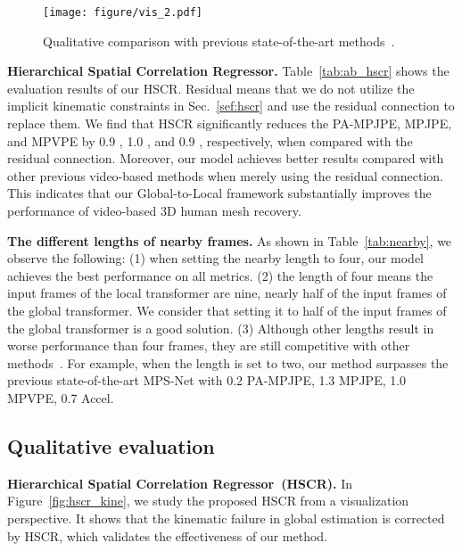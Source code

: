 \documentclass[10pt,twocolumn,letterpaper]{article}
\begin{document}
		\begin{figure}[!t]
			\texttt{[image: figure/vis\_2.pdf]}
			\vspace{-2 em}
			\caption{Qualitative comparison with previous state-of-the-art methods~\cite{TCMR, MPS-net}.}
			\vspace{-1.5 em}
			\label{fig:vis_2}
		\end{figure}
		
		
		
		
		
		
		\noindent\textbf{Hierarchical Spatial Correlation Regressor.}
		Table~\ref{tab:ab_hscr} shows the evaluation results of our HSCR. Residual means that we do not utilize the implicit kinematic constraints in Sec.~\ref{sef:hscr} and use the residual connection to replace them. We find that HSCR significantly reduces the PA-MPJPE, MPJPE, and MPVPE by 0.9 , 1.0 , and 0.9 , respectively, when compared with the residual connection. 
		Moreover, our model achieves better results compared with other previous video-based methods when merely using the residual connection.
		This indicates that our Global-to-Local framework substantially improves the performance of video-based 3D human mesh recovery.
		
		\noindent\textbf{The different lengths of nearby frames.}
		As shown in Table~\ref{tab:nearby}, we observe  the following: (1) when setting the nearby length to four, our model achieves the best performance on all metrics. (2) the length of four means the input frames of the local transformer are nine, nearly half of the input frames of the global transformer. We consider that setting it to half of the input frames of the global transformer is a good solution. (3) Although other lengths result in worse performance than four frames, they are still competitive with other methods~\cite{VIBE, TCMR, MPS-net}. For example, when the length is set to two, our method surpasses the previous state-of-the-art MPS-Net with 0.2  PA-MPJPE, 1.3  MPJPE, 1.0  MPVPE, 0.7  Accel.
		
		\subsection{Qualitative evaluation}
		
		\noindent\textbf{Hierarchical Spatial Correlation Regressor~(HSCR).}
		In Figure~\ref{fig:hscr_kine}, we study the proposed HSCR from a visualization perspective. It shows that the kinematic failure in global estimation is corrected by HSCR, which validates the effectiveness of our method.
		
\end{document}
